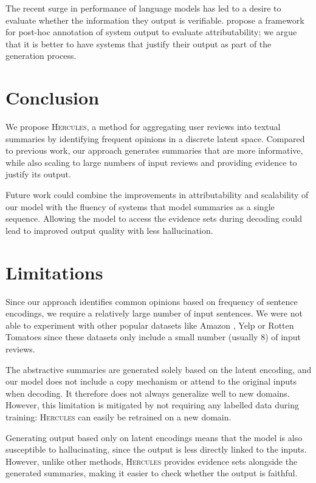 \documentclass[11pt]{article}
\begin{document}
The recent surge in performance of language models has led to a desire to evaluate whether the information they output is verifiable. \citet{DBLP:journals/corr/abs-2112-12870} propose a framework for post-hoc annotation of system output to evaluate attributability; we argue that it is better to have systems that justify their output as part of the generation process.

\section{Conclusion}

We propose \textsc{Hercules}, a method for aggregating user reviews into textual summaries by identifying frequent opinions in a discrete latent space. Compared to previous work, our approach generates summaries that are more informative, while also scaling to large numbers of input reviews and providing evidence to justify its output.

Future work could combine the improvements in attributability and scalability of our model with the fluency of systems that model summaries as a single sequence. Allowing the model to access the evidence sets during decoding could lead to improved output quality with less hallucination.


\section*{Limitations}

Since our approach identifies common opinions based on frequency of sentence encodings, we require a relatively large number of input sentences. We were not able to experiment with other popular datasets like Amazon \cite{10.1145/2872427.2883037}, Yelp \cite{meansum} or Rotten Tomatoes \cite{wang-ling-2016-neural} since these datasets only include a small number (usually 8) of input reviews.

The abstractive summaries are generated solely based on the latent encoding, and our model does not include a copy mechanism or attend to the original inputs when decoding. It therefore does not always generalize well to new domains. However, this limitation is mitigated by not requiring any labelled data during training: \textsc{Hercules} can easily be retrained on a new domain.

Generating output based only on latent encodings means that the model is also susceptible to hallucinating, since the output is less directly linked to the inputs. However, unlike other methods, \textsc{Hercules} provides evidence sets alongside the generated summaries, making it easier to check whether the output is faithful.
\end{document}
